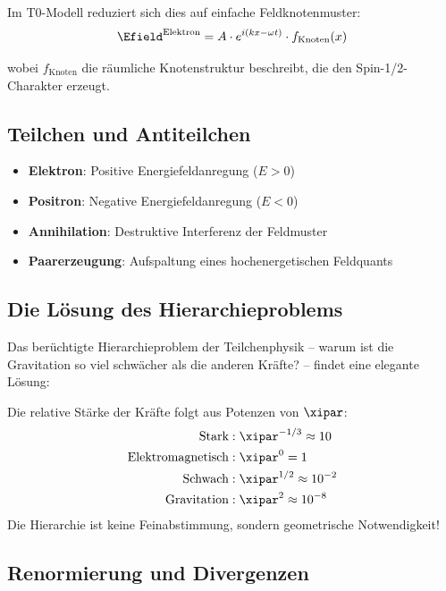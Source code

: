	Im T0-Modell reduziert sich dies auf einfache Feldknotenmuster:
	\begin{equation}
		\Efield^{\text{Elektron}} = A \cdot e^{i(kx - \omega t)} \cdot f_{\text{Knoten}}(x)
	\end{equation}
	
	wobei $f_{\text{Knoten}}$ die räumliche Knotenstruktur beschreibt, die den Spin-1/2-Charakter erzeugt.
	
	\subsection{Teilchen und Antiteilchen}
	
	\begin{itemize}
		\item \textbf{Elektron}: Positive Energiefeldanregung ($E > 0$)
		\item \textbf{Positron}: Negative Energiefeldanregung ($E < 0$)
		\item \textbf{Annihilation}: Destruktive Interferenz der Feldmuster
		\item \textbf{Paarerzeugung}: Aufspaltung eines hochenergetischen Feldquants
	\end{itemize}
	
	\subsection{Die Lösung des Hierarchieproblems}
	
	Das berüchtigte Hierarchieproblem der Teilchenphysik – warum ist die Gravitation so viel schwächer als die anderen Kräfte? – findet eine elegante Lösung:
	
	\begin{important}
		Die relative Stärke der Kräfte folgt aus Potenzen von $\xipar$:
		\begin{align}
			\text{Stark} &: \xipar^{-1/3} \approx 10 \\
			\text{Elektromagnetisch} &: \xipar^0 = 1 \\
			\text{Schwach} &: \xipar^{1/2} \approx 10^{-2} \\
			\text{Gravitation} &: \xipar^2 \approx 10^{-8}
		\end{align}
		Die Hierarchie ist keine Feinabstimmung, sondern geometrische Notwendigkeit!
	\end{important}
	
	\subsection{Renormierung und Divergenzen}
	
